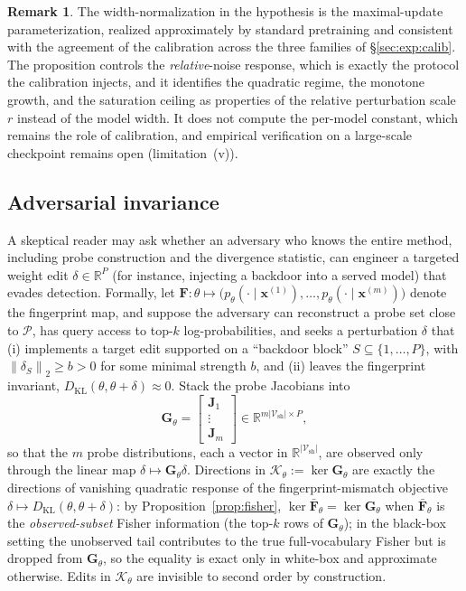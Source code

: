 \documentclass[11pt]{article}
\newcommand{\R}{\mathbb{R}}
\newcommand{\Vsh}{\mathcal{V}_{\mathrm{sh}}}
\newcommand{\norm}[1]{\left\lVert #1 \right\rVert}
\theoremstyle{definition}
\newtheorem{remark}{Remark}
\begin{document}
\begin{remark}
The width-normalization in the hypothesis is the maximal-update
parameterization, realized approximately by standard pretraining and consistent
with the agreement of the calibration across the three families of
\S\ref{sec:exp:calib}. The proposition controls the \emph{relative}-noise
response, which is exactly the protocol the calibration injects, and it
identifies the quadratic regime, the monotone growth, and the saturation
ceiling as properties of the relative perturbation scale $r$ instead of the
model width. It does not compute the per-model constant, which remains the role
of calibration, and empirical verification on a large-scale checkpoint remains
open (limitation~(v)).
\end{remark}

\subsection{Adversarial invariance}
\label{sec:app-adv}

A skeptical reader may ask whether an adversary who knows the entire method,
including probe construction and the divergence statistic, can engineer a
targeted weight edit $\delta \in \R^P$ (for instance, injecting a backdoor into
a served model) that evades detection. Formally, let
$\bm{F} : \theta \mapsto \big(p_\theta(\cdot \mid \bm{x}^{(1)}), \dots,
p_\theta(\cdot \mid \bm{x}^{(m)})\big)$ denote the fingerprint map, and suppose
the adversary can reconstruct a probe set close to $\mathcal{P}$, has query
access to top-$k$ log-probabilities, and seeks a perturbation $\delta$ that (i)
implements a target edit supported on a ``backdoor block'' $S \subseteq \{1,
\dots, P\}$, with $\norm{\delta_S}_2 \ge b > 0$ for some minimal strength $b$,
and (ii) leaves the fingerprint invariant, $D_{\mathrm{KL}}(\theta,
\theta+\delta) \approx 0$. Stack the probe Jacobians into
\begin{equation}
  \bm{G}_\theta =
  \begin{bmatrix} \bm{J}_1 \\ \vdots \\ \bm{J}_m \end{bmatrix}
  \in \R^{m|\Vsh| \times P},
  \label{eq:gstack}
\end{equation}
so that the $m$ probe distributions, each a vector in $\R^{|\Vsh|}$, are
observed only through the linear map $\delta \mapsto \bm{G}_\theta\delta$.
Directions in $\mathcal{K}_\theta := \ker \bm{G}_\theta$ are exactly the
directions of vanishing quadratic response of the fingerprint-mismatch
objective $\delta \mapsto D_{\mathrm{KL}}(\theta, \theta+\delta)$: by
Proposition~\ref{prop:fisher}, $\ker \bar{\bm{F}}_\theta = \ker \bm{G}_\theta$
when $\bar{\bm{F}}_\theta$ is the \emph{observed-subset} Fisher information (the
top-$k$ rows of $\bm{G}_\theta$); in the black-box setting the unobserved tail
contributes to the true full-vocabulary Fisher but is dropped from
$\bm{G}_\theta$, so the equality is exact only in white-box and approximate
otherwise. Edits in $\mathcal{K}_\theta$ are invisible to second order by
construction.
\end{document}
